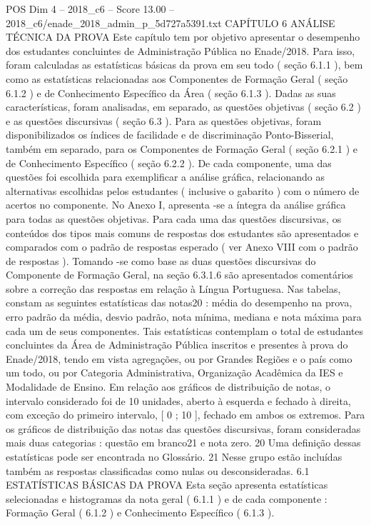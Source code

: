 \begin{textsample}{POS Dim 4 – 2018\_c6 – Score 13.00 – 2018\_c6/enade\_2018\_admin\_p\_5d727a5391.txt}  \label{ex:f4_pos_007}
CAPÍTULO 6 ANÁLISE TÉCNICA DA PROVA Este capítulo tem por objetivo apresentar o desempenho dos estudantes concluintes de Administração Pública no Enade/2018.
Para isso, foram calculadas as estatísticas básicas da prova em seu todo ( seção 6.1.1 ), bem como as estatísticas relacionadas aos Componentes de Formação Geral ( seção 6.1.2 ) e de Conhecimento Específico da Área ( seção 6.1.3 ).
Dadas as suas características, foram analisadas, em separado, as questões objetivas ( seção 6.2 ) e as questões discursivas ( seção 6.3 ).
Para as questões objetivas, foram disponibilizados os índices de facilidade e de discriminação Ponto-Bisserial, também em separado, para os Componentes de Formação Geral ( seção 6.2.1 ) e de Conhecimento Específico ( seção 6.2.2 ).
De cada componente, uma das questões foi escolhida para exemplificar a análise gráfica, relacionando as alternativas escolhidas pelos estudantes ( inclusive o gabarito ) com o número de acertos no componente.
No Anexo I, apresenta -se a íntegra da análise gráfica para todas as questões objetivas.
Para cada uma das questões discursivas, os conteúdos dos tipos mais comuns de respostas dos estudantes são apresentados e comparados com o padrão de respostas esperado ( ver Anexo VIII com o padrão de respostas ).
Tomando -se como base as duas questões discursivas do Componente de Formação Geral, na seção 6.3.1.6 são apresentados comentários sobre a correção das respostas em relação à Língua Portuguesa.
Nas tabelas, constam as seguintes estatísticas das notas20 : média do desempenho na prova, erro padrão da média, desvio padrão, nota mínima, mediana e nota máxima para cada um de seus componentes.
Tais estatísticas contemplam o total de estudantes concluintes da Área de Administração Pública inscritos e presentes à prova do Enade/2018, tendo em vista agregações, ou por Grandes Regiões e o país como um todo, ou por Categoria Administrativa, Organização Acadêmica da IES e Modalidade de Ensino.
Em relação aos gráficos de distribuição de notas, o intervalo considerado foi de 10 unidades, aberto à esquerda e fechado à direita, com exceção do primeiro intervalo, [ 0 ; 10 ], fechado em ambos os extremos.
Para os gráficos de distribuição das notas das questões discursivas, foram consideradas mais duas categorias : questão em branco21 e nota zero. 20 Uma definição dessas estatísticas pode ser encontrada no Glossário. 21 Nesse grupo estão incluídas também as respostas classificadas como nulas ou desconsideradas. 6.1 ESTATÍSTICAS BÁSICAS DA PROVA Esta seção apresenta estatísticas selecionadas e histogramas da nota geral ( 6.1.1 ) e de cada componente : Formação Geral ( 6.1.2 ) e Conhecimento Específico ( 6.1.3 ).

\end{textsample}
